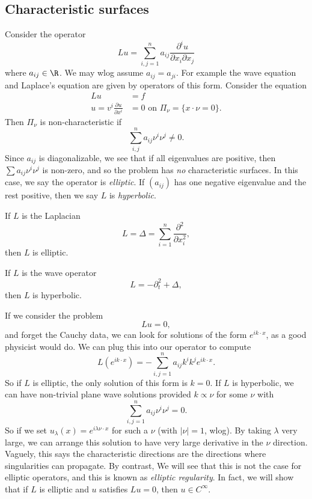 \documentclass[a4paper]{article}
\begin{document}
\subsection{Characteristic surfaces}
Consider the operator
\[
  Lu = \sum_{i, j = 1}^n a_{ij} \frac{\partial^i u}{\partial x_i \partial x_j}
\]
where $a_{ij} \in \R$. We may wlog assume $a_{ij} = a_{ji}$. For example the wave equation and Laplace's equation are given by operators of this form. Consider the equation
\begin{align*}
  Lu &= f\\
  u = v^i \frac{\partial u}{\partial x^i} &= 0 \text{ on }\Pi_\nu = \{x \cdot \nu = 0\}.
\end{align*}
Then $\Pi_\nu$ is non-characteristic if
\[
  \sum_{i, j}^n a_{ij} \nu^i \nu^j \not= 0.
\]
Since $a_{ij}$ is diagonalizable, we see that if all eigenvalues are positive, then $\sum a_{ij} \nu^i \nu^j$ is non-zero, and so the problem has \emph{no} characteristic surfaces. In this case, we say the operator is \emph{elliptic}. If $(a_{ij})$ has one negative eigenvalue and the rest positive, then we say $L$ is \emph{hyperbolic}.

\begin{eg}
  If $L$ is the Laplacian
  \[
    L = \Delta = \sum_{i= 1}^n \frac{\partial^2}{\partial x_i^2},
  \]
  then $L$ is elliptic.

  If $L$ is the wave operator
  \[
    L = - \partial_t^2 + \Delta,
  \]
  then $L$ is hyperbolic.
\end{eg}

If we consider the problem
\[
  Lu = 0,
\]
and forget the Cauchy data, we can look for solutions of the form $e^{ik\cdot x}$, as a good physicist would do. We can plug this into our operator to compute
\[
  L(e^{ik\cdot x}) = - \sum_{i, j = 1}^n a_{ij} k^i k^j e^{ik\cdot x}.
\]
So if $L$ is elliptic, the only solution of this form is $k = 0$. If $L$ is hyperbolic, we can have non-trivial plane wave solutions provided $k \propto \nu$ for some $\nu$ with
\[
  \sum_{i, j = 1}^n a_{ij} \nu^i \nu^j = 0.
\]
So if we set $u_\lambda(x) = e^{i\lambda \nu \cdot x}$ for such a $\nu$ (with $|\nu| = 1$, wlog). By taking $\lambda$ very large, we can arrange this solution to have very large derivative in the $\nu$ direction. Vaguely, this says the characteristic directions are the directions where singularities can propagate. By contrast, We will see that this is not the case for elliptic operators, and this is known as \emph{elliptic regularity}. In fact, we will show that if $L$ is elliptic and $u$ satisfies $Lu = 0$, then $u \in C^\infty$.
\end{document}
